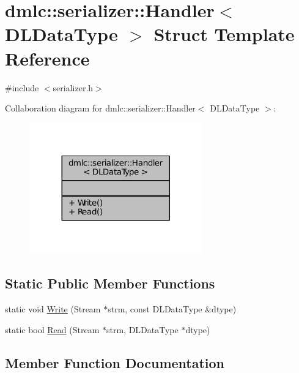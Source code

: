 \hypertarget{structdmlc_1_1serializer_1_1Handler_3_01DLDataType_01_4}{}\section{dmlc\+:\+:serializer\+:\+:Handler$<$ D\+L\+Data\+Type $>$ Struct Template Reference}
\label{structdmlc_1_1serializer_1_1Handler_3_01DLDataType_01_4}


{\ttfamily \#include $<$serializer.\+h$>$}



Collaboration diagram for dmlc\+:\+:serializer\+:\+:Handler$<$ D\+L\+Data\+Type $>$\+:
\nopagebreak
\begin{figure}[H]
\begin{center}
\leavevmode
\includegraphics[width=212pt]{structdmlc_1_1serializer_1_1Handler_3_01DLDataType_01_4__coll__graph}
\end{center}
\end{figure}
\subsection*{Static Public Member Functions}
\begin{DoxyCompactItemize}
\item 
static void \hyperlink{structdmlc_1_1serializer_1_1Handler_3_01DLDataType_01_4_a8b12d99c9d96d3a5bda461746bcc5ffa}{Write} (Stream $\ast$strm, const D\+L\+Data\+Type \&dtype)
\item 
static bool \hyperlink{structdmlc_1_1serializer_1_1Handler_3_01DLDataType_01_4_a98596da667d1aad2708015f5b15c35d8}{Read} (Stream $\ast$strm, D\+L\+Data\+Type $\ast$dtype)
\end{DoxyCompactItemize}


\subsection{Member Function Documentation}
